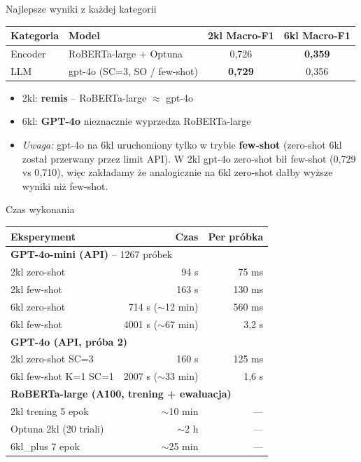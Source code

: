 \documentclass[10pt]{beamer}
\begin{document}
\begin{frame}{Najlepsze wyniki z każdej kategorii}
  \small
  \begin{center}
  \begin{tabular}{llcc}
    \toprule
    Kategoria & Model & 2kl Macro-F1 & 6kl Macro-F1 \\
    \midrule
    Encoder       & RoBERTa-large + Optuna             & 0{,}726          & \textbf{0{,}359} \\
    LLM           & gpt-4o (SC=3, SO / few-shot)       & \textbf{0{,}729} & 0{,}356 \\
    \bottomrule
  \end{tabular}
  \end{center}

  \vspace{0.5em}
  \begin{itemize}
    \item 2kl: \textbf{remis} -- RoBERTa-large $\approx$ gpt-4o
    \item 6kl: \textbf{GPT-4o} nieznacznie wyprzedza RoBERTa-large
    \item \emph{Uwaga:} gpt-4o na 6kl uruchomiony tylko w trybie \textbf{few-shot}
          (zero-shot 6kl został przerwany przez limit API). W 2kl gpt-4o
          zero-shot bił few-shot (0{,}729 vs 0{,}710), więc zakładamy że
          analogicznie na 6kl zero-shot dałby wyższe wyniki niż few-shot.
  \end{itemize}
\end{frame}

\begin{frame}{Czas wykonania}
  \small
  \begin{center}
  \begin{tabular}{lrr}
    \toprule
    Eksperyment & Czas & Per próbka \\
    \midrule
    \multicolumn{3}{l}{\textbf{GPT-4o-mini (API)} -- 1267 próbek} \\
    2kl zero-shot           & 94 s     & 75 ms \\
    2kl few-shot            & 163 s    & 130 ms \\
    6kl zero-shot           & 714 s ($\sim$12 min) & 560 ms \\
    6kl few-shot            & 4001 s ($\sim$67 min) & 3{,}2 s \\
    \midrule
    \multicolumn{3}{l}{\textbf{GPT-4o (API, próba 2)}} \\
    2kl zero-shot SC=3      & 160 s    & 125 ms \\
    6kl few-shot K=1 SC=1   & 2007 s ($\sim$33 min) & 1{,}6 s \\
    \midrule
    \multicolumn{3}{l}{\textbf{RoBERTa-large (A100, trening + ewaluacja)}} \\
    2kl trening 5 epok      & $\sim$10 min & --- \\
    Optuna 2kl (20 triali)  & $\sim$2 h    & --- \\
    6kl\_plus 7 epok        & $\sim$25 min & --- \\
    \bottomrule
  \end{tabular}
  \end{center}
\end{frame}
\end{document}
